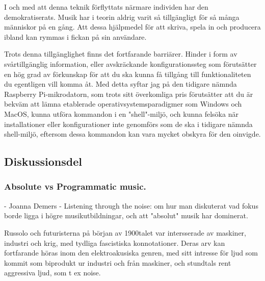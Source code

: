 \documentclass{article}
\begin{document}
  I och med att denna teknik förflyttats närmare individen har den demokratiserats. Musik har i teorin aldrig
  varit så tillgängligt för så många människor på en gång. Att dessa hjälpmedel för att skriva, spela in och
  producera ibland kan rymmas i fickan på sin användare. 

  Trots denna tillgänglighet finns det fortfarande barriärer. Hinder i form av svårtillgänglig information,
  eller avskräckande konfigurationssteg som förutsätter en hög grad av förkunskap för att du ska kunna få
  tillgång till funktionaliteten du egentligen vill komma åt. Med detta syftar jag på den tidigare nämnda
  Raspberry Pi-mikrodatorn, som trots sitt överkomliga pris förutsätter att du är bekväm att lämna etablerade
  operativsystemsparadigmer som Windows och MacOS, kunna utföra kommandon i en "shell"-miljö, och kunna
  felsöka när installationer eller konfigurationer inte genomförs som de ska i tidigare nämnda shell-miljö,
  eftersom dessa kommandon kan vara mycket obskyra för den oinvigde. 

  
  





  

\subsection{Diskussionsdel}


\subsubsection{Absolute vs Programmatic music.}
- Joanna Demers - Listening through the noise: om hur man diskuterat vad fokus borde ligga i högre
  musikutbildningar, och att "absolut" musik har dominerat.


  Russolo och futuristerna på början av 1900talet var intersserade av maskiner, industri och krig, med tydliga
  fascistiska konnotationer. Deras arv kan fortfarande höras inom den elektroakusiska genren, med sitt
  intresse för ljud som kommit som biprodukt ur industri och från maskiner, och stundtals rent aggressiva
  ljud, som t ex noise. 
\end{document}
